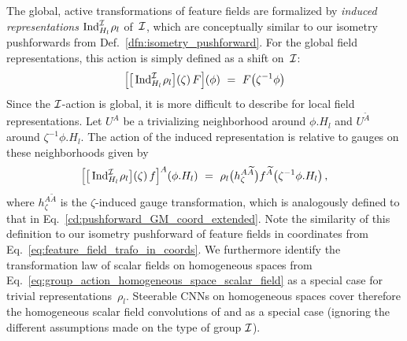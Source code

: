 The global, active transformations of feature fields are formalized by \emph{induced representations} $\operatorname{Ind}_{H_l}^{\mathcal{I}}\mkern-2mu \rho_l$ of~$\mathcal{I}$, which are conceptually similar to our isometry pushforwards from Def.~\ref{dfn:isometry_pushforward}.
For the global field representations, this action is simply defined as a shift on~$\mathcal{I}$:
\begin{align}
    \pig[ \big[ \Ind_{H_l}^{\I}\mkern-2mu \rho_l\big] (\zeta)\, F \pig] (\phi)\ =\ F\big( \zeta^{-1} \phi\big)
\end{align}
Since the $\mathcal{I}$-action is global, it is more difficult to describe for local field representations.
Let $U^A$ be a trivializing neighborhood around $\phi.H_l$ and $U^{\widetilde{A}}$ around $\zeta^{-1}\phi.H_l$.
The action of the induced representation is relative to gauges on these neighborhoods given by
\begin{align}
    \pig[ \big[\Ind_{H_l}^{\I}\mkern-2mu \rho_l\big] (\zeta)\, f\pig]^{\raisebox{2.5pt}{$\scriptstyle A$}} (\phi.H_l)
    \ =\ \rho_l\big( h^{A\widetilde{A}}_{\zeta} \big) f^{\widetilde{A}} \big( \zeta^{-1} \phi.H_l \big) \,,
\end{align}
where $h^{A\widetilde{A}}_{\zeta}$ is the $\zeta$-induced gauge transformation, which is analogously defined to that in Eq.~\eqref{cd:pushforward_GM_coord_extended}.
Note the similarity of this definition to our isometry pushforward of feature fields in coordinates from Eq.~\eqref{eq:feature_field_trafo_in_coords}.
We furthermore identify the transformation law of scalar fields on homogeneous spaces from Eq.~\eqref{eq:group_action_homogeneous_space_scalar_field} as a special case for trivial representations~$\rho_l$.
Steerable CNNs on homogeneous spaces cover therefore the homogeneous scalar field convolutions of \citet{Kondor2018-GENERAL} and \citet{bekkers2020bspline} as a special case (ignoring the different assumptions made on the type of group $\mathcal{I}$).






